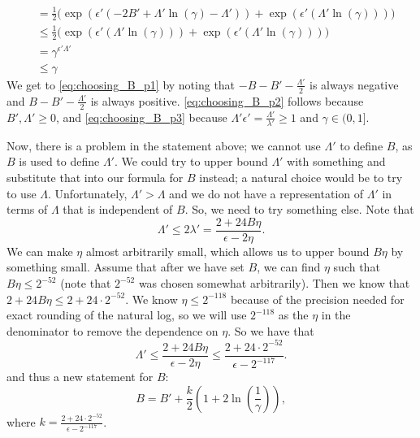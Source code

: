 \documentclass[11pt]{scrartcl} %
\begin{document}
\begin{align}
							  &= \frac{1}{2} \bigg( \exp \left( \epsilon' \left( -2B' + \Lambda' \ln(\gamma) - \Lambda'  \right) \right) + \exp\left( \epsilon' \left( \Lambda' \ln(\gamma) \right) \right) \bigg) \nonumber \\
							  &\leq \frac{1}{2} \bigg( \exp \left( \epsilon' \left( \Lambda' \ln(\gamma)\right) \right) + \exp\left( \epsilon' \left( \Lambda' \ln(\gamma) \right) \right) \bigg) \label{eq:choosing_B_p2} \\
							  &= \gamma^{\epsilon' \Lambda'} \nonumber \\
							  &\leq \gamma \label{eq:choosing_B_p3}
\end{align}
We get to \eqref{eq:choosing_B_p1} by noting that $-B-B'-\frac{\Lambda'}{2}$ is always negative and
$B-B'-\frac{\Lambda'}{2}$ is always positive. \eqref{eq:choosing_B_p2} follows because
$B', \Lambda' \geq 0$, and \eqref{eq:choosing_B_p3} because
$\Lambda'\epsilon' = \frac{\Lambda'}{\lambda'} \geq 1$ and $\gamma \in (0,1]$. \newline

Now, there is a problem in the statement above; we cannot use $\Lambda'$ to define $B$, as $B$ is used
to define $\Lambda'$. We could try to upper bound $\Lambda'$ with something and substitute that into
our formula for $B$ instead; a natural choice would be to try to use $\Lambda$.
Unfortunately, $\Lambda' > \Lambda$ and we do not have a representation
of $\Lambda'$ in terms of $\Lambda$ that is independent of $B$.
So, we need to try something else. Note that
\[ \Lambda' \leq 2\lambda' = \frac{2 + 24B\eta}{\epsilon - 2\eta}. \]
We can make $\eta$ almost arbitrarily small, which allows us to upper bound $B\eta$ by something small.
Assume that after we have set $B$, we can find $\eta$ such that $B\eta \leq 2^{-52}$ (note that $2^{-52}$
was chosen somewhat arbitrarily). Then we know that $2 + 24B\eta \leq 2 + 24 \cdot 2^{-52}$.
We know $\eta \leq 2^{-118}$ because of the precision needed for exact rounding of the natural log,
so we will use $2^{-118}$ as the $\eta$ in the denominator to remove the dependence on $\eta$.
So we have that
\[ \Lambda' \leq \frac{2 + 24B\eta}{\epsilon-2\eta} \leq \frac{2+24 \cdot 2^{-52}}{\epsilon - 2^{-117}}. \]
and thus a new statement for $B$:
\[ B = B' + \frac{k}{2} \left(1 + 2\ln \left( \frac{1}{\gamma} \right) \right), \]
where $k = \frac{2+24 \cdot 2^{-52}}{\epsilon - 2^{-117}}$. \newline
\end{document}
